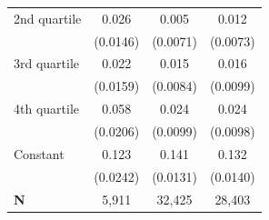 {\begin{tabular}{l*{3}{c}}
\addlinespace
\hspace*{1em}2nd quartile&       0.026\sym{*}  &       0.005         &       0.012         \\
                    &    (0.0146)         &    (0.0071)         &    (0.0073)         \\
\addlinespace
\hspace*{1em}3rd quartile&       0.022         &       0.015\sym{*}  &       0.016         \\
                    &    (0.0159)         &    (0.0084)         &    (0.0099)         \\
\addlinespace
\hspace*{1em}4th quartile&       0.058\sym{***}&       0.024\sym{**} &       0.024\sym{**} \\
                    &    (0.0206)         &    (0.0099)         &    (0.0098)         \\
\addlinespace
\hspace*{1em}Constant&       0.123\sym{***}&       0.141\sym{***}&       0.132\sym{***}\\
                    &    (0.0242)         &    (0.0131)         &    (0.0140)         \\
\midrule
\textbf{N}          &       5,911         &      32,425         &      28,403         \\
\bottomrule
\end{tabular}
}
